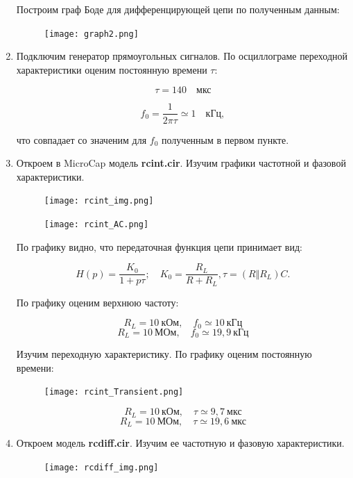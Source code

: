 \documentclass[a4paper, 12pt]{article}%
\begin{document}
\begin{enumerate}
Построим граф Боде для дифференцирующей цепи по полученным данным:

\begin{figure}[h!]
\centering
\texttt{[image: graph2.png]}
\label{fig:Image1}
\end{figure}

\item Подключим генератор прямоугольных сигналов. По осциллограме переходной характеристики оценим постоянную времени $\tau$:

\[\tau = 140 \quad \textit{мкс}\]

\[f_0 = \frac{1}{2\pi\tau} \simeq 1 \quad \textit{кГц},\]

что совпадает со значеним для $f_0$ полученным в первом пункте.

\item Откроем в MicroCap модель \textbf{rcint.cir}. Изучим графики частотной и фазовой характеристики.

\begin{figure}[h!]
\centering
\texttt{[image: rcint\_img.png]}
\label{fig:Image1}
\end{figure}

\begin{figure}[h!]
\centering
\texttt{[image: rcint\_AC.png]}
\label{fig:Image1}
\end{figure}

По графику видно, что передаточная функция цепи принимает вид:

\[H(p) = \frac{K_0}{1 + p\tau}; \quad K_0 = \frac{R_L}{R + R_L},\tau = (R\Vert R_L) C.\]

По графику оценим верхнюю частоту:

\[R_L = 10 \: \textit{кОм}, \quad f_0 \simeq 10 \: \textit{кГц}\]
\[R_L = 10 \: \textit{МОм}, \quad f_0 \simeq 19,9 \: \textit{кГц}\]

Изучим переходную характеристику. По графику оценим постоянную времени:

\begin{figure}[h!]
\centering
\texttt{[image: rcint\_Transient.png]}
\label{fig:Image1}
\end{figure}

\[R_L = 10 \: \textit{кОм}, \quad \tau \simeq 9,7 \: \textit{мкс}\]
\[R_L = 10 \: \textit{МОм}, \quad \tau \simeq 19,6 \: \textit{мкс}\]

\item Откроем модель \textbf{rcdiff.cir}. Изучим ее частотную и фазовую характеристики.

\begin{figure}[h!]
\centering
\texttt{[image: rcdiff\_img.png]}
\label{fig:Image1}
\end{figure}


\end{enumerate}
\end{document}
